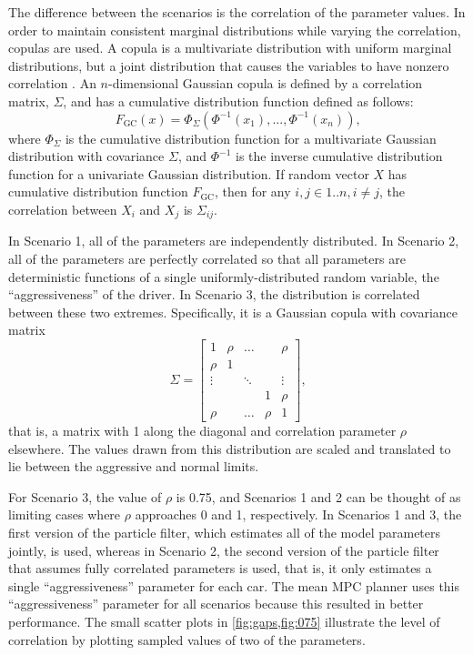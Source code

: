 The difference between the scenarios is the correlation of the parameter values.
In order to maintain consistent marginal distributions while varying the correlation, copulas are used.
A copula is a multivariate distribution with uniform marginal distributions, but a joint distribution that causes the variables to have nonzero correlation \cite{nelsen2007introduction}.
An $n$-dimensional Gaussian copula is defined by a correlation matrix, $\Sigma$, and has a cumulative distribution function defined as follows:
\begin{equation}
    F_{\text{GC}}(x) = \Phi_\Sigma (\Phi^{-1}(x_1), ... , \Phi^{-1}(x_n))\text{,}
\end{equation}
where $\Phi_\Sigma$ is the cumulative distribution function for a multivariate Gaussian distribution with covariance $\Sigma$, and $\Phi^{-1}$ is the inverse cumulative distribution function for a univariate Gaussian distribution.
If random vector $X$ has cumulative distribution function $F_{\text{GC}}$, then for any $i, j \in 1..n, i \neq j$, the correlation between $X_i$ and $X_j$ is $\Sigma_{ij}$.

In Scenario 1, all of the parameters are independently distributed.
In Scenario 2, all of the parameters are perfectly correlated so that all parameters are deterministic functions of a single uniformly-distributed random variable, the ``aggressiveness'' of the driver.
In Scenario 3, the distribution is correlated between these two extremes.
Specifically, it is a Gaussian copula with covariance matrix
\begin{equation}
    \Sigma = \begin{bmatrix}
        1 & \rho & \dots & & \rho \\
        \rho & 1 & &  &  \\
        \vdots &  & \ddots & & \vdots \\
           & & & 1 & \rho \\
        \rho & & \dots & \rho & 1
    \end{bmatrix}\text{,}
\end{equation}
that is, a matrix with 1 along the diagonal and correlation parameter $\rho$ elsewhere.
The values drawn from this distribution are scaled and translated to lie between the aggressive and normal limits.

For Scenario 3, the value of $\rho$ is \num{0.75}, and Scenarios 1 and 2 can be thought of as limiting cases where $\rho$ approaches 0 and 1, respectively.
In Scenarios 1 and 3, the first version of the particle filter, which estimates all of the model parameters jointly, is used, whereas in Scenario 2, the second version of the particle filter that assumes fully correlated parameters is used, that is, it only estimates a single ``aggressiveness'' parameter for each car.
The mean MPC planner uses this ``aggressiveness'' parameter for all scenarios because this resulted in better performance.
The small scatter plots in \cref{fig:gaps,fig:075} illustrate the level of correlation by plotting sampled values of two of the parameters.

